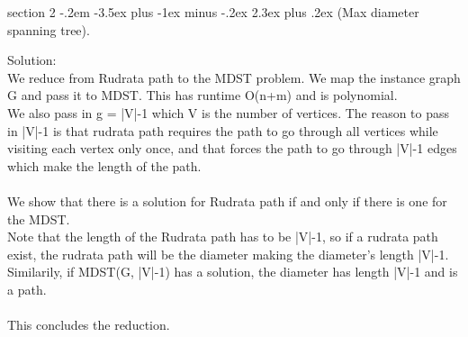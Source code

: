 \documentclass{article}
\makeatletter
\newenvironment{problem}{\@startsection
       {section}
       {2}
       {-.2em}
       {-3.5ex plus -1ex minus -.2ex}
       {2.3ex plus .2ex}
       {\pagebreak[3]%
       \large\bf\noindent{Problem }
       }
       }
\makeatother
\begin{document}
\newpage

\begin{problem}{(Max diameter spanning tree).}

Solution:\\
We reduce from Rudrata path to the MDST problem. We map the instance graph G and pass it to MDST. This has runtime O(n+m) and is polynomial.\\
We also pass in g = |V|-1 which V is the number of vertices. The reason to pass in |V|-1 is that rudrata path requires the path to go through all vertices while visiting each vertex only once, and that forces the path to go through |V|-1 edges which make the length of the path.\\
\\
We show that there is a solution for Rudrata path if and only if there is one for the MDST.\\
Note that the length of the Rudrata path has to be |V|-1, so if a rudrata path exist, the rudrata path will be the diameter making the diameter's length |V|-1.\\
Similarily, if MDST(G, |V|-1) has a solution, the diameter has length |V|-1 and is a path.\\
\\
This concludes the reduction.\\

\end{problem}
\end{document}

